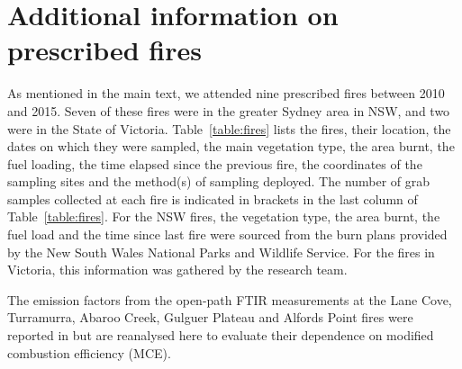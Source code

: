 \documentclass[acp, manuscript]{copernicus}
\begin{document}
\section{Additional information on prescribed fires}
As mentioned in the main text, we attended nine prescribed fires between 2010 and 2015. Seven of these fires were in the greater Sydney area in NSW, and two were in the State of Victoria. Table~\ref{table:fires} lists the fires, their location, the dates on which they were sampled, the main vegetation type, the area burnt, the fuel loading, the time elapsed since the previous fire, the coordinates of the sampling sites and the method(s) of sampling deployed. The number of grab samples collected at each fire is indicated in brackets in the last column of Table~\ref{table:fires}. For the NSW fires, the vegetation type, the area burnt, the fuel load and the time since last fire were sourced from the burn plans provided by the New South Wales National Parks and Wildlife Service. For the fires in Victoria, this information was gathered by the research team. 

The emission factors from the open-path FTIR measurements at the Lane Cove, Turramurra, Abaroo Creek, Gulguer Plateau and Alfords Point fires were reported in \citet{Paton-Walsh2014} but are reanalysed here to evaluate their dependence on modified combustion efficiency (MCE).   
\end{document}

